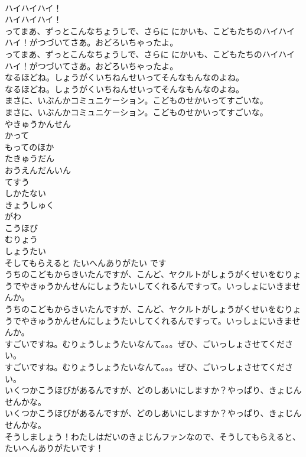 \documentclass[8pt]{extreport}
\begin{document}
\begin{CJK}{UTF8}{min}
\\	ハイハイハイ！
\\	ハイハイハイ！
\\	ってまあ、ずっとこんなちょうしで、さらに にかいも、こどもたちのハイハイハイ！がつづいてさあ。おどろいちゃったよ。
\\	ってまあ、ずっとこんなちょうしで、さらに にかいも、こどもたちのハイハイハイ！がつづいてさあ。おどろいちゃったよ。
\\	なるほどね。しょうがくいちねんせいってそんなもんなのよね。
\\	なるほどね。しょうがくいちねんせいってそんなもんなのよね。
\\	まさに、いぶんかコミュニケーション。こどものせかいってすごいな。
\\	まさに、いぶんかコミュニケーション。こどものせかいってすごいな。
\\	やきゅうかんせん
\\	かって
\\	もってのほか
\\	たきゅうだん
\\	おうえんだんいん
\\	てすう
\\	しかたない
\\	きょうしゅく
\\	がわ
\\	こうほび
\\	むりょう
\\	しょうたい
\\	そしてもらえると たいへんありがたい です
\\	うちのこどもからきいたんですが、こんど、ヤクルトがしょうがくせいをむりょうでやきゅうかんせんにしょうたいしてくれるんですって。いっしょにいきませんか。
\\	うちのこどもからきいたんですが、こんど、ヤクルトがしょうがくせいをむりょうでやきゅうかんせんにしょうたいしてくれるんですって。いっしょにいきませんか。
\\	すごいですね。むりょうしょうたいなんて。。。ぜひ、ごいっしょさせてください。
\\	すごいですね。むりょうしょうたいなんて。。。ぜひ、ごいっしょさせてください。
\\	いくつかこうほびがあるんですが、どのしあいにしますか？やっぱり、きょじんせんかな。
\\	いくつかこうほびがあるんですが、どのしあいにしますか？やっぱり、きょじんせんかな。
\\	そうしましょう！わたしはだいのきょじんファンなので、そうしてもらえると、たいへんありがたいです！

\end{CJK}
\end{document}
